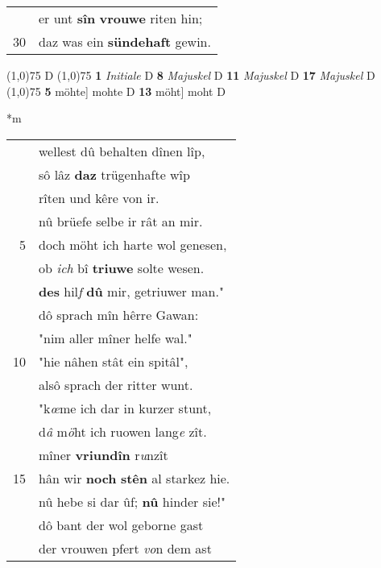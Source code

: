 \documentclass[8pt,a4paper,notitlepage]{article}
\begin{document}
\begin{table}[ht]
\begin{minipage}[t]{0.5\linewidth}
\begin{tabular}{rl}
 & er unt \textbf{sîn} \textbf{vrouwe} riten hin;\\ 
30 & daz was ein \textbf{sündehaft} gewin.\\ 
\end{tabular}
\scriptsize
\line(1,0){75} \newline
D \newline
\line(1,0){75} \newline
\textbf{1} \textit{Initiale} D  \textbf{8} \textit{Majuskel} D  \textbf{11} \textit{Majuskel} D  \textbf{17} \textit{Majuskel} D  \newline
\line(1,0){75} \newline
\textbf{5} möhte] mohte D \textbf{13} möht] moht D \newline
\end{minipage}
\hspace{0.5cm}
\begin{minipage}[t]{0.5\linewidth}
\small
\begin{center}*m
\end{center}
\begin{tabular}{rl}
 & wellest dû behalten dînen lîp,\\ 
 & sô lâz \textbf{daz} trügenhafte wîp\\ 
 & rîten und kêre von ir.\\ 
 & nû brüefe selbe ir rât an mir.\\ 
5 & doch möht ich harte wol genesen,\\ 
 & ob \textit{ich} bî \textbf{triuwe} solte wesen.\\ 
 & \textbf{des} hil\textit{f} \textbf{dû} mir, getriuwer man."\\ 
 & dô sprach mîn hêrre Gawan:\\ 
 & "nim aller mîner helfe wal."\\ 
10 & "hie nâhen stât ein spitâl",\\ 
 & alsô sprach der ritter wunt.\\ 
 & "k\textit{œ}me ich dar in kurzer stunt,\\ 
 & d\textit{â} m\textit{ö}ht ich ruowen lang\textit{e} zît.\\ 
 & mîner \textbf{vriundîn} r\textit{u}nzît\\ 
15 & hân wir \textbf{noch} \textbf{stên} al starkez hie.\\ 
 & nû hebe si dar ûf; \textbf{nû} hinder sie!"\\ 
 & dô bant der wol geborne gast\\ 
 & der vrouwen pfert \textit{vo}n dem ast\\ 

\end{tabular}
\end{minipage}
\end{table}
\end{document}
